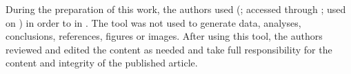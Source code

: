 %
%
During the preparation of this work, the authors used  (; accessed
through ; used on
) in order to  in .  The tool was not used to generate
data, analyses, conclusions, references, figures or images. After using this
tool, the authors reviewed and edited the content as needed and take full
responsibility for the content and integrity of the published article.
